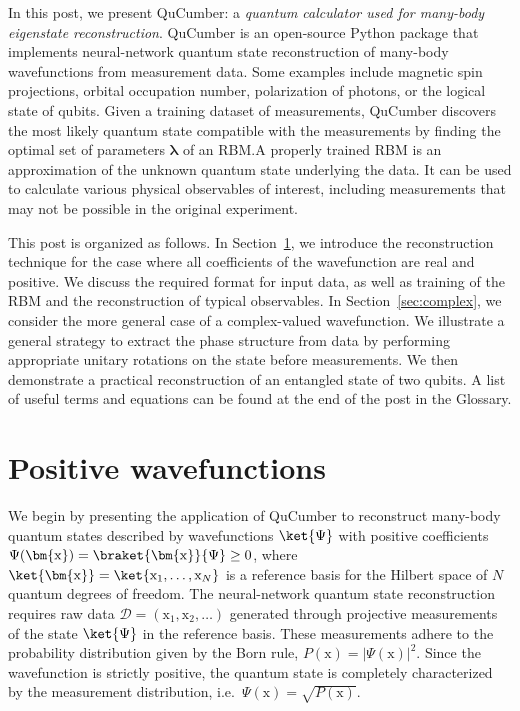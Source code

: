 \documentclass[submission, Phys, hidelnks]{SciPost}
\newcommand{\x}{\bm{\mathrm{x}}}
\begin{document}
In this post, we present QuCumber: a \textit{quantum calculator used for
many-body eigenstate reconstruction}. QuCumber is an open-source Python
package that implements neural-network quantum state reconstruction of
many-body wavefunctions from measurement data.
Some examples include magnetic spin projections, orbital occupation number,
polarization of photons, or the logical state of qubits.
Given a training dataset of measurements, QuCumber discovers the most likely
quantum state compatible with the measurements by finding the optimal set of
parameters $\bm{\lambda}$ of an RBM.\@ A properly trained RBM is an
approximation of the unknown quantum state underlying the data.
It can be used to calculate various physical observables of interest, including
measurements that may not be possible in the original experiment.

This post is organized as follows.
In Section~\ref{sec:positive}, we introduce the reconstruction technique for
the case where all coefficients of the wavefunction are real and positive.
We discuss the required format for input data, as well as training of the RBM
and the reconstruction of typical observables. In Section~\ref{sec:complex},
we consider the more general case of a complex-valued wavefunction.
We illustrate a general strategy to extract the phase structure from data by
performing appropriate unitary rotations on the state before measurements.
We then demonstrate a practical reconstruction of an entangled state of two
qubits. A list of useful terms and equations can be found at the end of the
post in the Glossary.

\section{Positive wavefunctions}\label{sec:positive}
We begin by presenting the application of QuCumber to reconstruct many-body
quantum states described by wavefunctions $\ket{\Psi}$ with positive
coefficients $\Psi(\x)=\braket{\x}{\Psi} \ge 0$,
where $\ket{\x}=\ket{ \mathrm{x}_1,\dots,\mathrm{x}_N }$ is a reference basis
for the Hilbert space of $N$ quantum degrees of freedom.
The neural-network quantum state reconstruction requires raw data
$\mathcal{D}=(\x_1,\x_2,\dots)$ generated through projective measurements of
the state $\ket{ \Psi}$ in the reference basis.
These measurements adhere to the probability distribution given by the Born
rule, $P(\x)=|\Psi(\x)|^2$. Since the wavefunction is strictly positive, the
quantum state is completely characterized by the measurement distribution,
i.e.~$\Psi(\x)=\sqrt{P(\x)}$.
\end{document}
